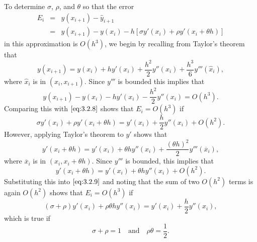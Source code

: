 \documentclass{ximera}
\begin{document}
To determine $\sigma$, $\rho$, and $\theta$ so that the error
\begin{equation} \label{eq:3.2.8}
\begin{array}{rcl}
E_i&=&y(x_{i+1})-\hat y_{i+1}\\
&=&y(x_{i+1})-y(x_i)-h\left[\sigma y'(x_i)+\rho y'(x_i+\theta
h)\right]
\end{array}
\end{equation}
in this approximation is $O(h^3)$, we begin by recalling from Taylor's
theorem that
$$
y(x_{i+1})=y(x_i)+hy'(x_i)+\frac{h^2}{2}y''(x_i)+\frac{h^3}{6}y'''(\hat
x_i),
$$
where $\hat x_i$ is in $(x_i,x_{i+1})$. Since $y'''$ is bounded this
implies that
$$
 y(x_{i+1})-y(x_i)-hy'(x_i)-\frac{h^2}{2}y''(x_i)=O(h^3).
$$
Comparing this with $\eqref{eq:3.2.8}$ shows that $E_i=O(h^3)$ if
\begin{equation} \label{eq:3.2.9}
\sigma y'(x_i)+\rho y'(x_i+\theta h)=y'(x_i)+\frac{h}{2}y''(x_i)
+O(h^2).
\end{equation}
However, applying Taylor's theorem to $y'$ shows that
$$
y'(x_i+\theta h)=y'(x_i)+\theta h y''(x_i)+\frac{(\theta
h)^2}{2}y'''(\overline x_i),
$$
where $\overline x_i$ is in $(x_i,x_i+\theta h)$. Since $y'''$ is
bounded, this implies that
$$
y'(x_i+\theta h)=y'(x_i)+\theta h y''(x_i)+O(h^2).
$$
Substituting this into $\eqref{eq:3.2.9}$ and noting that the sum of
two $O(h^2)$ terms is again $O(h^2)$ shows that
$E_i=O(h^3)$ if
$$
(\sigma+\rho)y'(x_i)+\rho\theta h y''(x_i)=
y'(x_i)+\frac{h}{2}y''(x_i),
$$
which is true if
\begin{equation} \label{eq:3.2.10}
\sigma+\rho=1 \quad\mbox{and}\quad \rho\theta=\frac{1}{2}.
\end{equation}
\end{document}
